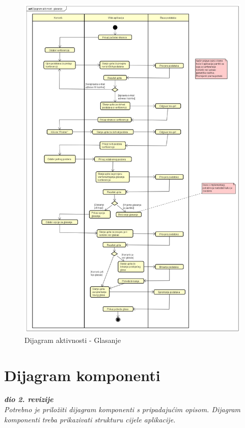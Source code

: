 			 \begin{figure}
			 	\includegraphics[width=\linewidth]{Slike/ActivityDiagram}
			 	\caption{Dijagram aktivnosti - Glasanje}
			 \end{figure}
			
			\eject
		\section{Dijagram komponenti}
		
			\textbf{\textit{dio 2. revizije}}\\
		
			 \textit{Potrebno je priložiti dijagram komponenti s pripadajućim opisom. Dijagram komponenti treba prikazivati strukturu cijele aplikacije.}
			 
